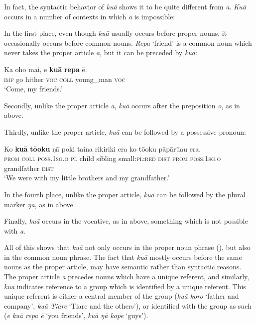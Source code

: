 In fact, the syntactic behavior of \textit{kuā} shows it to be quite different from \textit{a}. \textit{Kuā} occurs in a number of contexts in which \textit{a} is impossible:

In the first place, even though \textit{kuā} usually occurs before proper nouns, it occasionally occurs before common nouns. \textit{Repa} ‘friend’ is a common noun which never takes the proper article \textit{a}, but it can be preceded by \textit{kuā}:

\ea\label{ex:5.12}
\gll Ka oho mai, e \textbf{kuā} \textbf{repa} ē. \\
\textsc{imp} go hither \textsc{voc} \textsc{coll} young\_man \textsc{voc} \\

\glt
‘Come, my friends.’ \textstyleExampleref{[R313.004]} 
\z

Secondly, unlike the proper article \textit{a}, \textit{kuā} occurs after the preposition \textit{o}, as in  above.

Thirdly, unlike the proper article, \textit{kuā} can be followed by a possessive pronoun:

\ea\label{ex:5.13}
\gll Ko \textbf{kuā} \textbf{tō{\ꞌ}oku} ŋā poki taina rikiriki era ko tō{\ꞌ}oku  pāpārū{\ꞌ}au era.\\
\textsc{prom} \textsc{coll} \textsc{poss.1sg.o} \textsc{pl} child sibling small:\textsc{pl}:\textsc{red} \textsc{dist} \textsc{prom} \textsc{poss.1sg.o}  grandfather \textsc{dist}\\

\glt
‘We were with my little brothers and my grandfather.’ \textstyleExampleref{[R123.014]} 
\z

In the fourth place, unlike the proper article, \textit{kuā} can be followed by the plural marker \textit{ŋā}, as in  above.

Finally, \textit{kuā} occurs in the vocative, as in  above, something which is not possible with \textit{a}.

All of this shows that \textit{kuā} not only occurs in the proper noun phrase (), but also in the common noun phrase. The fact that \textit{kuā} mostly occurs before the same nouns as the proper article, may have semantic rather than syntactic reasons. The proper article \textit{a} precedes nouns which have a unique referent, and similarly, \textit{kuā} indicates reference to a group which is identified by a unique referent. This unique referent is either a central member of the group (\textit{kuā koro} ‘father and company’, \textit{kuā Tiare} ‘Tiare and the others’), or identified with the group as such (\textit{e kuā repa ē} ‘you friends’, \textit{kuā ŋā kope} ‘guys’).
